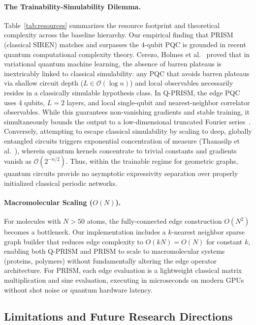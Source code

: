 \documentclass[10pt,twocolumn,letterpaper]{article}
\begin{document}
\paragraph{The Trainability-Simulability Dilemma.}
Table~\ref{tab:resources} summarizes the resource footprint and theoretical complexity across the baseline hierarchy.
Our empirical finding that PRISM (classical SIREN) matches and surpasses the 4-qubit PQC is grounded in recent quantum computational complexity theory.
Cerezo, Holmes et al.~\cite{Cerezo:2023nqf} proved that in variational quantum machine learning, the absence of barren plateaus is inextricably linked to classical simulability: any PQC that avoids barren plateaus via shallow circuit depth ($L \in \mathcal{O}(\log n)$) and local observables necessarily resides in a classically simulable hypothesis class.
In Q-PRISM, the edge PQC uses 4 qubits, $L = 2$ layers, and local single-qubit and nearest-neighbor correlator observables.
While this guarantees non-vanishing gradients and stable training, it simultaneously bounds the output to a low-dimensional truncated Fourier series~\cite{landman2023approximating, Schuld:2020enb}.
Conversely, attempting to escape classical simulability by scaling to deep, globally entangled circuits triggers exponential concentration of measure (Thanasilp et al.~\cite{Thanasilp:2022agd}), wherein quantum kernels concentrate to trivial constants and gradients vanish as $\mathcal{O}(2^{-n/2})$.
Thus, within the trainable regime for geometric graphs, quantum circuits provide no asymptotic expressivity separation over properly initialized classical periodic networks.

\paragraph{Macromolecular Scaling ($O(N)$).}
For molecules with $N > 50$ atoms, the fully-connected edge construction $O(N^2)$ becomes a bottleneck. Our implementation includes a $k$-nearest neighbor sparse graph builder that reduces edge complexity to $O(kN) = O(N)$ for constant $k$, enabling both Q-PRISM and PRISM to scale to macromolecular systems (proteins, polymers) without fundamentally altering the edge operator architecture.
For PRISM, each edge evaluation is a lightweight classical matrix multiplication and sine evaluation, executing in microseconds on modern GPUs without shot noise or quantum hardware latency.

\subsection{Limitations and Future Research Directions}
\end{document}
